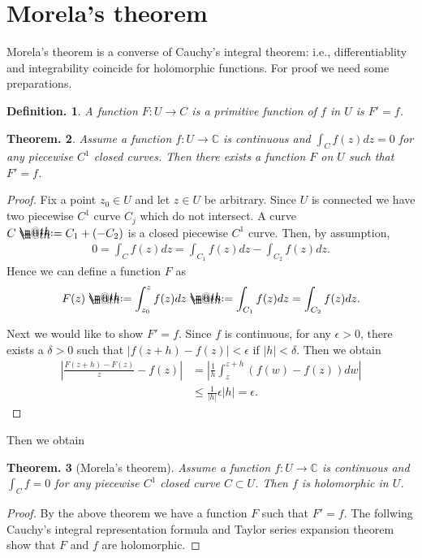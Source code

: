 \documentclass[openany, a4paper, oneside]{book}
\makeatletter
\newcommand*{\defeq}{\mathrel{\rlap{%
\raisebox{0.3ex}{$\m@th\cdot$}}%
\raisebox{-0.3ex}{$\m@th\cdot$}}%
=}
\theoremstyle{break}
\newtheorem{thm}{Theorem.}[section]
\theoremstyle{breakdefn}
\newtheorem{defn}[thm]{Definition.}
\newcommand{\abs}[1]{\left|#1\right|}
\newcommand{\rbk}[1]{\left (#1\right)}
\newcommand{\bbC}{\mathbb{C}}
\makeatother
\begin{document}
\section{Morela's theorem}
\label{sec-6-1-4}

Morela's theorem is a converse of Cauchy's integral theorem:
i.e., differentiablity and integrability coincide for holomorphic functions.
For proof we need some preparations.
\begin{defn}
 A function $F \colon U \to C$ is a primitive function of $f$ in $U$ is $F' = f$.
\end{defn}
\begin{thm}
 Assume a function $f \colon U \to \bbC$ is continuous and $\int_C f (z) dz = 0$ for any piecewise $C^1$ closed curves.
 Then there exists a function $F$ on $U$ such that $F' = f$.
\end{thm}
\begin{proof}
Fix a point $z_0 \in U$ and let $z \in U$ be arbitrary.
Since $U$ is connected we have two piecewise $C^1$ curve $C_j$ which do not intersect.
A curve $C \defeq C_1 + (- C_2)$ is a closed piecewise $C^1$ curve.
Then, by assumption,
\begin{align}
 0
 =
 \int_C f (z) dz
 =
 \int_{C_1} f (z) dz - \int_{C_2} f (z) dz.
\end{align}
Hence we can define a function $F$ as
\begin{align}
 F (z)
 \defeq
 \int_{z_0}^{z} f (z) dz
 \defeq
 \int_{C_1} f (z) dz = \int_{C_2} f (z) dz.
\end{align}

Next we would like to show $F' = f$.
Since $f$ is continuous, for any $\epsilon > 0$, there exists a $\delta > 0$ such that $\abs{f (z+h) - f (z)} < \epsilon$ if $\abs{h} < \delta$.
Then we obtain
 \begin{align}
  \abs{\frac{F (z+h) - F (z)}{z} - f (z)}
  &=
  \abs{\frac{1}{h}\int_{z}^{z+h} \rbk{f (w) - f (z)} dw} \\
  &\leq
  \frac{1}{\abs{h}} \epsilon \abs{h} = \epsilon.
  \end{align}
\end{proof}

Then we obtain
\begin{thm}[Morela's theorem]
 Assume a function $f \colon U \to \bbC$ is continuous and $\int_C f = 0$ for any piecewise $C^1$ closed curve $C \subset U$.
 Then $f$ is holomorphic in $U$.
\end{thm}
\begin{proof}
By the above theorem we have a function $F$ such that $F' = f$.
The follwing Cauchy's integral representation formula and Taylor series expansion theorem show that $F$ and $f$ are holomorphic.
\end{proof}
\end{document}
